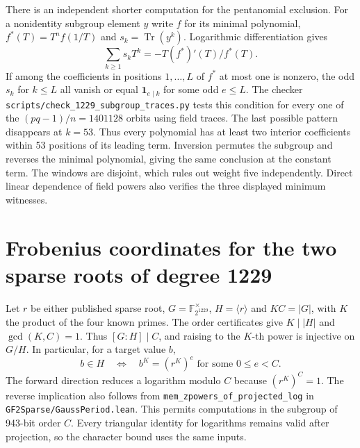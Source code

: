 \documentclass[11pt]{article}
\begin{document}
There is an independent shorter computation for the pentanomial
exclusion. For a nonidentity subgroup element \(y\) write \(f\) for
its minimal polynomial, \(f^*(T)=T^nf(1/T)\) and
\(s_k=\operatorname{Tr}(y^k)\). Logarithmic differentiation gives
\[
   \sum_{k\ge1}s_kT^k=-T(f^*)'(T)/f^*(T).
\]
If among the coefficients in positions \(1,\ldots,L\) of \(f^*\)
at most one is nonzero, the odd \(s_k\) for \(k\le L\) all vanish
or equal \(\mathbf1_{e\mid k}\) for some odd \(e\le L\).
The checker \nolinkurl{scripts/check_1229_subgroup_traces.py}
tests this condition for every one of the \((pq-1)/n=1401128\)
orbits using field traces. The last possible pattern disappears at
\(k=53\). Thus every polynomial has at least two interior coefficients
within 53 positions of its leading term. Inversion permutes the
subgroup and reverses the minimal polynomial, giving the same
conclusion at the constant term. The windows are disjoint, which
rules out weight five independently. Direct linear dependence of
field powers also verifies the three displayed minimum witnesses.

\section{Frobenius coordinates for the two sparse roots of degree 1229}
\label{sec:1229-frobenius-models}
Let \(r\) be either published sparse root, \(G=\mathbb F_{2^{1229}}^\times\),
\(H=\langle r\rangle\) and \(K C=|G|\), with \(K\) the product of the
four known primes. The order certificates give \(K\mid |H|\) and
\(\gcd(K,C)=1\). Thus \([G:H]\mid C\), and raising to the \(K\)-th
power is injective on \(G/H\). In particular, for a target value \(b\),
\[
     b\in H\quad\Longleftrightarrow\quad
        b^K=(r^K)^e\text{ for some }0\le e<C.
\]
The forward direction reduces a logarithm modulo \(C\) because
\((r^K)^C=1\). The reverse implication also follows from
\nolinkurl{mem_zpowers_of_projected_log} in
\nolinkurl{GF2Sparse/GaussPeriod.lean}. This permits computations in
the subgroup of 943-bit order \(C\). Every triangular identity for
logarithms remains valid after projection, so the character bound
uses the same inputs.
\end{document}
